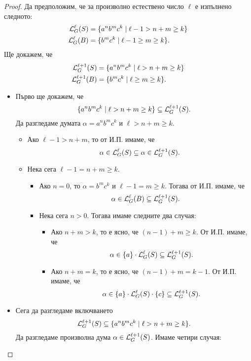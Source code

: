 \begin{proof}
  Да предположим, че за произволно естествено число $\ell$ е изпълнено следното:
  \begin{align*}
    \mathcal{L}^\ell_G(S) & = \{a^nb^mc^k \mid \ell - 1 > n+m \geq k\}\\
    \mathcal{L}^\ell_G(B)  & = \{ b^mc^k \mid \ell -1 \geq m \geq k\}.
  \end{align*}
  Ще докажем, че
  \begin{align*}
    \mathcal{L}^{\ell+1}_G(S) & = \{a^nb^mc^k \mid \ell > n+m \geq k\}\\
    \mathcal{L}^{\ell+1}_G(B)  & = \{ b^mc^k \mid \ell \geq m \geq k\}.
  \end{align*}

  \begin{itemize}
  \item
    Първо ще докажем, че
    \[\{a^nb^mc^k \mid \ell > n+m \geq k\} \subseteq \mathcal{L}^{\ell+1}_G(S).\]
    Да разгледаме думата $\alpha = a^nb^mc^k$ и $\ell > n+m \geq k$.
    \begin{itemize}
    \item
      Ако $\ell - 1 > n+m$, то от И.П. имаме, че
      \[\alpha \in \mathcal{L}^{\ell}_G(S) \subseteq \alpha \in \mathcal{L}^{\ell+1}_G(S).\]
    \item
      Нека сега $\ell-1 = n+m \geq k$.
      \begin{itemize}
      \item
        Ако $n = 0$, то $\alpha = b^mc^k$ и $\ell-1 = m \geq k$. Тогава от И.П. имаме, че
        \[\alpha \in \mathcal{L}^{\ell}_G(B) \subseteq \mathcal{L}^{\ell+1}_G(S).\]
      \item
        Нека сега $n > 0$. Тогава имаме следните два случая:
        \begin{itemize}
        \item 
          Ако $n + m > k$, то е ясно, че $(n-1) + m \geq k$. От И.П. имаме, че
          \[\alpha \in \{a\} \cdot \mathcal{L}^\ell_G(S) \subseteq \mathcal{L}^{\ell+1}_G(S).\]
        \item
          Ако $n + m = k$, то е ясно, че $(n-1) + m = k-1$. От И.П. имаме, че
          \[\alpha \in \{a\} \cdot \mathcal{L}^\ell_G(S) \cdot \{c\} \subseteq \mathcal{L}^{\ell+1}_G(S).\]
        \end{itemize}
      \end{itemize}
    \end{itemize}
  \item
    Сега да разгледаме включването
    \[\mathcal{L}^{\ell+1}_G(S) \subseteq \{a^nb^mc^k \mid \ell > n+m \geq k\}.\]
    Да разгледаме произволна дума $\alpha \in \mathcal{L}^{\ell+1}_G(S)$. Имаме четири случая:

\end{itemize}
\end{proof}
